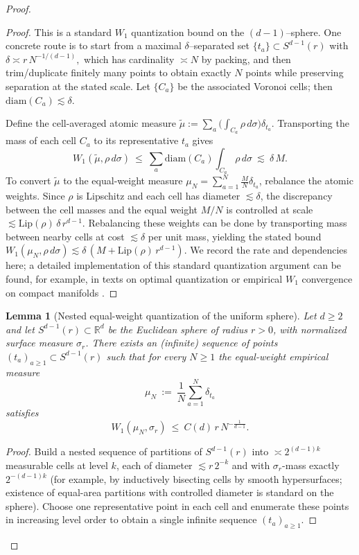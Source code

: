 \documentclass[11pt]{article}
\newcommand{\REVMZ}[1]{\textcolor{teal}{#1}}  %
\numberwithin{equation}{section}  %
\theoremstyle{plain}
\newtheorem{lemma}[theorem]{Lemma}
\theoremstyle{definition}
\theoremstyle{remark}
\newcommand{\R}{\mathbb{R}}
\begin{document}
\begin{proof}
\begin{proof}
This is a standard $W_1$ quantization bound on the $(d\!-\!1)$--sphere.
One concrete route is to start from a maximal $\delta$--separated set $\{t_a\}\subset S^{d-1}(r)$ with
\(
\delta\asymp r\,N^{-1/(d-1)},
\)
which has cardinality $\asymp N$ by packing, and then trim/duplicate finitely many points to obtain exactly $N$ points while preserving separation at the stated scale.
Let $\{C_a\}$ be the associated Voronoi cells; then $\mathrm{diam}(C_a)\lesssim \delta$.

Define the cell-averaged atomic measure $\widetilde\mu:=\sum_a \bigl(\int_{C_a}\rho\,d\sigma\bigr)\delta_{t_a}$.
Transporting the mass of each cell $C_a$ to its representative $t_a$ gives
\[
W_1(\widetilde\mu,\rho\,d\sigma)\ \le\ \sum_a \mathrm{diam}(C_a)\int_{C_a}\rho\,d\sigma\ \lesssim\ \delta\,M.
\]
To convert $\widetilde\mu$ to the equal-weight measure $\mu_N=\sum_{a=1}^N \frac{M}{N}\delta_{t_a}$, rebalance the atomic weights.
Since $\rho$ is Lipschitz and each cell has diameter $\lesssim\delta$, the discrepancy between the cell masses and the equal weight $M/N$
is controlled at scale $\lesssim \mathrm{Lip}(\rho)\,\delta\,r^{d-1}$.
Rebalancing these weights can be done by transporting mass between nearby cells at cost $\lesssim \delta$ per unit mass, yielding the stated bound
\(
W_1(\mu_N,\rho\,d\sigma)\lesssim \delta\,(M+\mathrm{Lip}(\rho)\,r^{d-1}).
\)
We record the rate and dependencies here; a detailed implementation of this standard quantization argument can be found, for example, in texts on optimal quantization
or empirical $W_1$ convergence on compact manifolds \REVMZ{\cite{Villani03}}.
\end{proof}


\begin{lemma}[Nested equal-weight quantization of the uniform sphere]\label{lem:sphere-quantize-nested}
Let $d\ge 2$ and let $S^{d-1}(r)\subset\R^d$ be the Euclidean sphere of radius $r>0$, with normalized surface measure $\sigma_r$.
There exists an (infinite) sequence of points $(t_a)_{a\ge 1}\subset S^{d-1}(r)$ such that for every $N\ge 1$ the equal-weight empirical measure
\[
\mu_N\ :=\ \frac{1}{N}\sum_{a=1}^N \delta_{t_a}
\]
satisfies
\[
W_1(\mu_N,\sigma_r)\ \le\ C(d)\,r\,N^{-\frac{1}{d-1}}.
\]
\end{lemma}

\begin{proof}
Build a nested sequence of partitions of $S^{d-1}(r)$ into $\asymp 2^{(d-1)k}$ measurable cells at level $k$, each of diameter $\lesssim r\,2^{-k}$
and with $\sigma_r$-mass exactly $2^{-(d-1)k}$ (for example, by inductively bisecting cells by smooth hypersurfaces; existence of equal-area partitions with
controlled diameter is standard on the sphere).
Choose one representative point in each cell and enumerate these points in increasing level order to obtain a single infinite sequence $(t_a)_{a\ge 1}$.


\end{proof}
\end{proof}
\end{document}
